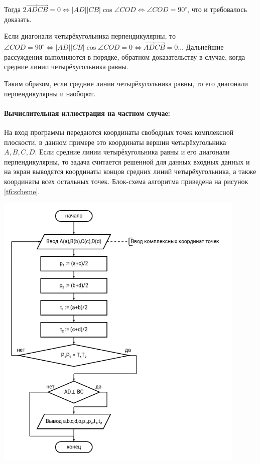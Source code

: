 {   Тогда \(2 \overrightarrow{AD} \overrightarrow{CB} = 0\Leftrightarrow \left\lvert AD\right\rvert
   \left\lvert CB\right\rvert \cos{\angle{COD}} \Leftrightarrow \angle{COD} = 90^\circ\),
   что и требовалось доказать.

   Если диагонали четырёхугольника перпендикулярны, то \(\angle{COD} = 90^\circ \Leftrightarrow \left\lvert AD\right\rvert \left\lvert CB\right\rvert \cos{\angle{COD}} = 0 \Leftrightarrow \overrightarrow{AD}\overrightarrow{CB}=
   0 \dots\)
   Дальнейшие рассуждения выполняются в порядке, обратном доказательству в случае, когда средние линии четырёхугольника равны.

   Таким образом, если средние линии четырёхугольника равны, то его диагонали перпендикулярны и наоборот.
   \paragraph{Вычислительная иллюстрация на частном случае:} На вход программы передаются координаты
   свободных точек комплексной плоскости, в данном примере это координаты вершин четырёхугольника
   \(A,B,C,D\). Если средние линии четырёхугольника равны и его диагонали перпендикулярны,
   то задача считается решенной для данных входных данных и на экран выводятся координаты концов
   средних линий четырёхугольника, а также координаты всех остальных точек. Блок-схема алгоритма
   приведена на рисунок \ref{t6:scheme}.
   \begin{center}
      \includegraphics[width=0.9\textwidth]{images/task6-diagram.png}
      \label{t6:scheme}
   \end{center}
}

